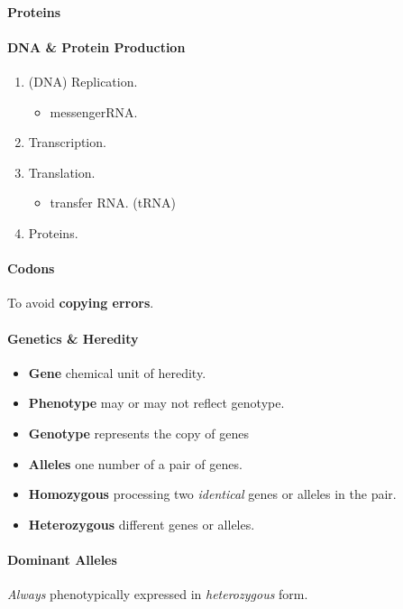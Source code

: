 \documentclass{article}
\begin{document}
	\paragraph{Proteins}
	\paragraph{DNA \& Protein Production}
	\begin{enumerate}
		\item (DNA) Replication.
			\begin{itemize}
				\item messengerRNA.
			\end{itemize}
		\item Transcription.
		\item Translation.
			\begin{itemize}
				\item transfer RNA. (tRNA)
			\end{itemize}
		\item Proteins.
	\end{enumerate}
	\paragraph{Codons} To avoid \textbf{copying errors}.
	\paragraph{Genetics \& Heredity}
	\begin{itemize}
		\item \textbf{Gene} chemical unit of heredity.
		\item \textbf{Phenotype} may or may not reflect genotype.
		\item \textbf{Genotype} represents the copy of genes 
		\item \textbf{Alleles} one number of a pair of genes.
	\end{itemize}
	\begin{itemize}
		\item \textbf{Homozygous} processing two \emph{identical} genes or alleles in the pair.
		\item \textbf{Heterozygous} different genes or alleles.
	\end{itemize}
	\paragraph{Dominant Alleles} \emph{Always} phenotypically expressed in \emph{heterozygous} form.
\end{document}
